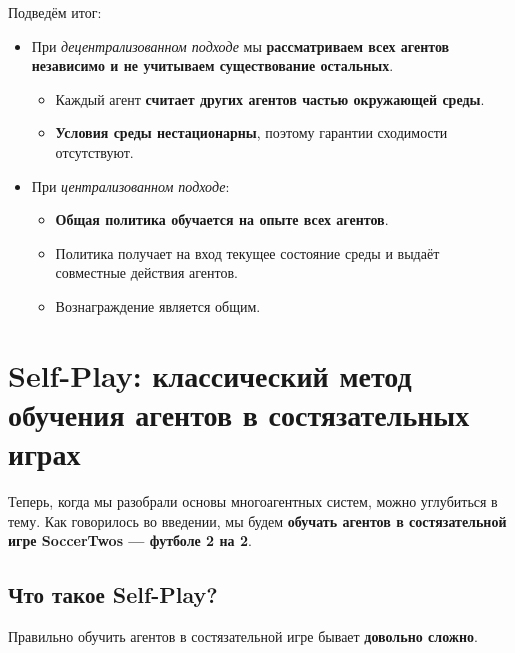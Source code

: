 \documentclass[11pt,a4paper]{article}
\begin{document}
Подведём итог:

\begin{itemize}
\tightlist
\item
  При \emph{децентрализованном подходе} мы \textbf{рассматриваем всех агентов независимо и не учитываем существование остальных}.

  \begin{itemize}
  \tightlist
  \item
    Каждый агент \textbf{считает других агентов частью окружающей среды}.
  \item
    \textbf{Условия среды нестационарны}, поэтому гарантии сходимости отсутствуют.
  \end{itemize}
\item
  При \emph{централизованном подходе}:

  \begin{itemize}
  \tightlist
  \item
    \textbf{Общая политика обучается на опыте всех агентов}.
  \item
    Политика получает на вход текущее состояние среды и выдаёт совместные действия агентов.
  \item
    Вознаграждение является общим.
  \end{itemize}
\end{itemize}

\section{Self-Play: классический метод обучения агентов в состязательных играх}\label{self-play-a-classic-technique-to-train-competitive-agents-in-adversarial-games}

Теперь, когда мы разобрали основы многоагентных систем, можно углубиться в тему. Как говорилось во введении, мы будем \textbf{обучать агентов в состязательной игре SoccerTwos --- футболе 2 на 2}.


\subsection{Что такое Self-Play?}\label{what-is-self-play}

Правильно обучить агентов в состязательной игре бывает \textbf{довольно сложно}.
\end{document}
